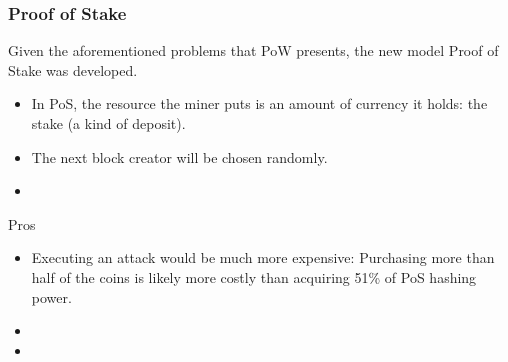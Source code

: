 \documentclass[notitlepage, usenames,dvipsnames]{beamer}
\begin{document}
\begin{frame}
    \frametitle{Proof of Stake}

    Given the aforementioned problems that PoW presents, the new model Proof of Stake was developed.

    \begin{itemize}
        \item In PoS, the resource the miner puts is an amount of currency it holds: the stake (a kind of deposit).
        \item The next block creator will be chosen randomly.
        \item %
    \end{itemize}

    \begin{exampleblock}{Pros}
        \begin{itemize}
            \item Executing an attack would be much more expensive: Purchasing more than half of the coins is likely more costly than acquiring 51\% of PoS hashing power.
            \item
            \item
        \end{itemize}
    \end{exampleblock}

\end{frame}


\begin{frame}
    \frametitle{}

\end{frame}


\begin{frame}
    \frametitle{}

\end{frame}


\begin{frame}
    \frametitle{}

\end{frame}
\end{document}
